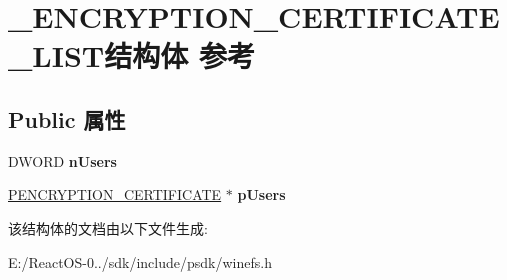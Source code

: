 \hypertarget{struct___e_n_c_r_y_p_t_i_o_n___c_e_r_t_i_f_i_c_a_t_e___l_i_s_t}{}\section{\+\_\+\+E\+N\+C\+R\+Y\+P\+T\+I\+O\+N\+\_\+\+C\+E\+R\+T\+I\+F\+I\+C\+A\+T\+E\+\_\+\+L\+I\+S\+T结构体 参考}
\label{struct___e_n_c_r_y_p_t_i_o_n___c_e_r_t_i_f_i_c_a_t_e___l_i_s_t}
\subsection*{Public 属性}
\begin{DoxyCompactItemize}
\item 
\mbox{\label{struct___e_n_c_r_y_p_t_i_o_n___c_e_r_t_i_f_i_c_a_t_e___l_i_s_t_ab401a970d477215a8cee1b0ddebf4884}} 
D\+W\+O\+RD {\bfseries n\+Users}
\item 
\mbox{\label{struct___e_n_c_r_y_p_t_i_o_n___c_e_r_t_i_f_i_c_a_t_e___l_i_s_t_a519910c1cb9fc75bee10db70241e5fb9}} 
\hyperlink{struct___e_n_c_r_y_p_t_i_o_n___c_e_r_t_i_f_i_c_a_t_e}{P\+E\+N\+C\+R\+Y\+P\+T\+I\+O\+N\+\_\+\+C\+E\+R\+T\+I\+F\+I\+C\+A\+TE} $\ast$ {\bfseries p\+Users}
\end{DoxyCompactItemize}


该结构体的文档由以下文件生成\+:\begin{DoxyCompactItemize}
\item 
E\+:/\+React\+O\+S-\/0../sdk/include/psdk/winefs.\+h\end{DoxyCompactItemize}
